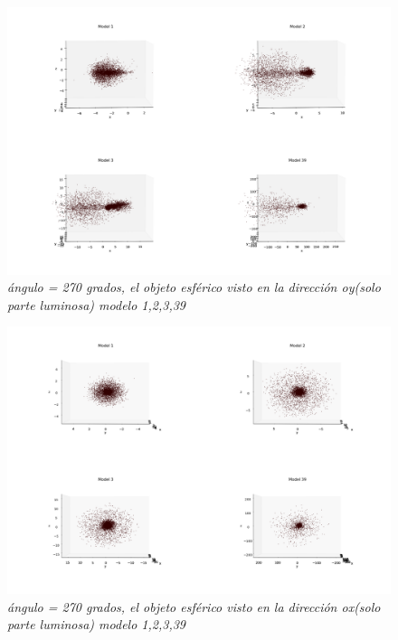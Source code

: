 \documentclass[12pt]{article} %
\renewcommand{\=}[1]{\stackrel{#1}{=}} %
\theoremstyle{definition}
\theoremstyle{remark}
\begin{document}
\begin{figure}[!ht]
 \centering
 \includegraphics[scale=0.2]{sep5-270deg-eoy.png}
 \caption{\emph{ ángulo = 270 grados, el objeto esférico visto en la dirección oy(solo parte luminosa) modelo 1,2,3,39 }}
\end{figure}

\begin{figure}[!ht]
 \centering
 \includegraphics[scale=0.2]{sep5-270deg-eox.png}
 \caption{\emph{ ángulo = 270 grados, el objeto esférico visto en la dirección ox(solo parte luminosa) modelo 1,2,3,39 }}
\end{figure}
\end{document}
